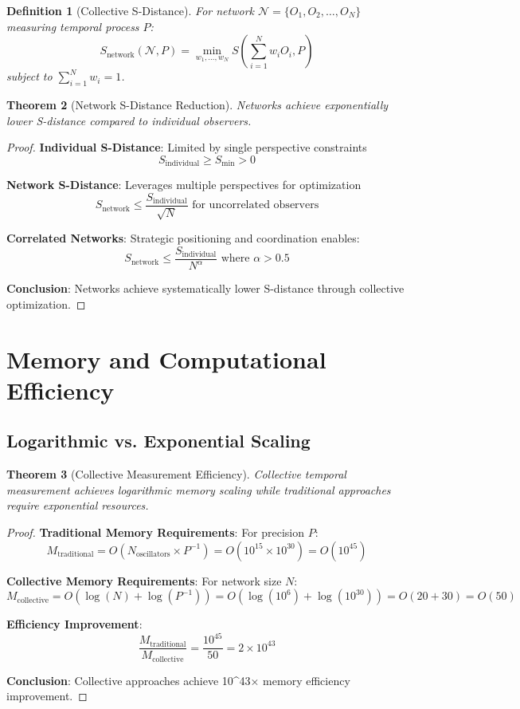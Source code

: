 \documentclass[12pt,a4paper]{article}
\newtheorem{theorem}{Theorem}[section]
\newtheorem{definition}[theorem]{Definition}
\begin{document}
\begin{definition}[Collective S-Distance]
For network $\mathcal{N} = \{O_1, O_2, \ldots, O_N\}$ measuring temporal process $P$:
$$S_{\text{network}}(\mathcal{N}, P) = \min_{w_1,\ldots,w_N} S\left(\sum_{i=1}^N w_i O_i, P\right)$$
subject to $\sum_{i=1}^N w_i = 1$.
\end{definition}

\begin{theorem}[Network S-Distance Reduction]
Networks achieve exponentially lower S-distance compared to individual observers.
\end{theorem}

\begin{proof}
\textbf{Individual S-Distance}: Limited by single perspective constraints
$$S_{\text{individual}} \geq S_{\min} > 0$$

\textbf{Network S-Distance}: Leverages multiple perspectives for optimization
$$S_{\text{network}} \leq \frac{S_{\text{individual}}}{\sqrt{N}} \text{ for uncorrelated observers}$$

\textbf{Correlated Networks}: Strategic positioning and coordination enables:
$$S_{\text{network}} \leq \frac{S_{\text{individual}}}{N^{\alpha}} \text{ where } \alpha > 0.5$$

\textbf{Conclusion}: Networks achieve systematically lower S-distance through collective optimization.
\end{proof}

\section{Memory and Computational Efficiency}

\subsection{Logarithmic vs. Exponential Scaling}

\begin{theorem}[Collective Measurement Efficiency]
Collective temporal measurement achieves logarithmic memory scaling while traditional approaches require exponential resources.
\end{theorem}

\begin{proof}
\textbf{Traditional Memory Requirements}: For precision $P$:
$$M_{\text{traditional}} = O(N_{\text{oscillators}} \times P^{-1}) = O(10^{15} \times 10^{30}) = O(10^{45})$$

\textbf{Collective Memory Requirements}: For network size $N$:
$$M_{\text{collective}} = O(\log(N) + \log(P^{-1})) = O(\log(10^6) + \log(10^{30})) = O(20 + 30) = O(50)$$

\textbf{Efficiency Improvement}:
$$\frac{M_{\text{traditional}}}{M_{\text{collective}}} = \frac{10^{45}}{50} = 2 \times 10^{43}$$

\textbf{Conclusion}: Collective approaches achieve 10^{43}× memory efficiency improvement.
\end{proof}
\end{document}
